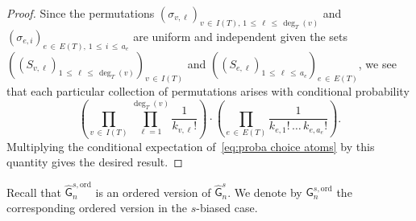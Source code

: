 \documentclass[AHL,Unicode,longabstracts,published]{cedram}
\newcommand{\ord}{\mathrm{ord}}
\newcommand{\sG}{\mathsf{G}}
\begin{document}
\begin{proof}
Since the permutations $(\sigma_{v,\ell})_{v\,\in \,I(T),\,1\,\le\,\ell\,\le\,\deg_T(v)}$ and $(\sigma_{e,i})_{e\,\in\,E(T),\,1\,\leq\,i\,\leq\,a_e}$ are uniform and independent given the sets $((S_{v,\ell})_{1\,\le\,\ell\,\le\,\deg_T(v)})_{v\,\in\,I(T)}$ and $((S_{e,\ell})_{1\,\le\,\ell\,\le\,a_e})_{e\,\in\,E(T)}$, we see that each particular collection of permutations arises with conditional probability
\[
\left(\prod_{v\,\in\,I(T)}\prod_{\ell=1}^{\deg_T(v)}\frac{1}{k_{v,\ell}!}\right)\cdot\left(\prod_{e\,\in\, E(T)}\frac{1}{k_{e,1}!\,\dots\,k_{e,a_e}!}\right).
\]
Multiplying the conditional expectation of~\eqref{eq:proba choice atoms} by this quantity gives the desired result.
\end{proof}

Recall that $\widehat{\sG}_{n}^{s,\ord}$ is an ordered version of $\widehat{\sG}_{n}^s$. We denote by $\sG_{n}^{s,\ord}$ the corresponding ordered version in the $s$-biased case.
\end{document}

